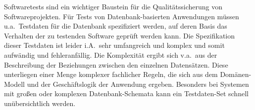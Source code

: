 
%
%
%
%



Softwaretests sind ein wichtiger Baustein für die Qualitätssicherung von Softwareprojekten. Für Tests von Datenbank-basierten Anwendungen müssen u.a.~Testdaten für die Datenbank spezifiziert werden, auf deren Basis das Verhalten der zu testenden Software 
geprüft werden kann.
%
%
Die Spezifikation dieser Testdaten ist leider i.A.~sehr umfangreich und komplex und somit aufwändig und fehleranfällig.
%
%
Die Komplexität ergibt sich v.a.~aus der Beschreibung der Beziehungen zwischen den einzelnen Datensätzen.
%
Diese unterliegen einer Menge komplexer fachlicher Regeln, die sich aus dem Domänen-Modell und der Geschäftslogik der Anwendung ergeben.
%
Besonders bei Systemen mit großen oder komplexen Datenbank-Schemata kann ein Testdaten-Set schnell unübersichtlich werden.



